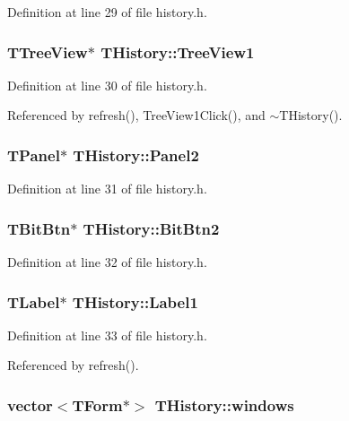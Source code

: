 Definition at line 29 of file history.h.\hypertarget{classTHistory_ce7f826948e9130c7c20d879e7b8d80c}{
\subsubsection[TreeView1]{\setlength{\rightskip}{0pt plus 5cm}TTreeView$\ast$ {\bf THistory::TreeView1}}}
\label{classTHistory_ce7f826948e9130c7c20d879e7b8d80c}




Definition at line 30 of file history.h.

Referenced by refresh(), TreeView1Click(), and $\sim$THistory().\hypertarget{classTHistory_628b8da1ed6bee8471e6baa1d8d9911a}{
\subsubsection[Panel2]{\setlength{\rightskip}{0pt plus 5cm}TPanel$\ast$ {\bf THistory::Panel2}}}
\label{classTHistory_628b8da1ed6bee8471e6baa1d8d9911a}




Definition at line 31 of file history.h.\hypertarget{classTHistory_58430353f17dbe5b387caabeb221f65b}{
\subsubsection[BitBtn2]{\setlength{\rightskip}{0pt plus 5cm}TBitBtn$\ast$ {\bf THistory::BitBtn2}}}
\label{classTHistory_58430353f17dbe5b387caabeb221f65b}




Definition at line 32 of file history.h.\hypertarget{classTHistory_b308f0efb659683a8d9c7881ca03f2c7}{
\subsubsection[Label1]{\setlength{\rightskip}{0pt plus 5cm}TLabel$\ast$ {\bf THistory::Label1}}}
\label{classTHistory_b308f0efb659683a8d9c7881ca03f2c7}




Definition at line 33 of file history.h.

Referenced by refresh().\hypertarget{classTHistory_46b9676e3638c8006171026e66f96306}{
\subsubsection[windows]{\setlength{\rightskip}{0pt plus 5cm}vector$<$TForm$\ast$$>$ {\bf THistory::windows}}}
\label{classTHistory_46b9676e3638c8006171026e66f96306}




